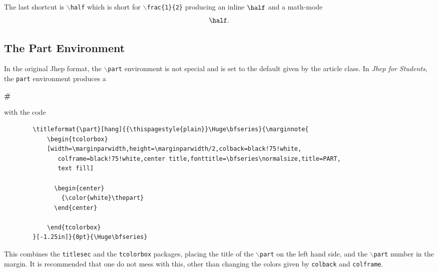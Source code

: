 \documentclass[10pt]{article}
\begin{document}
	The last shortcut is \texttt{$\backslash$half} which is short for \texttt{$\backslash$frac\{1\}\{2\}} producing an inline $\half$ and a math-mode
	\begin{equation*}
		\half.
	\end{equation*}



	\subsection{The Part Environment}
	In the original Jhep format, the \texttt{$\backslash$part} environment is not special and is set to the default given by the article class. In \textit{Jhep for Students}, the \texttt{part} environment produces a

	{{\centering
		\begin{tcolorbox}[width=\marginparwidth,height=\marginparwidth/2,colback=black!75!white,colframe=black!75!white,center title,fonttitle=\bfseries\normalsize,title=PART,text fill]
		  \begin{center}
		  {\color{white}\Huge\bfseries\#}
		  \end{center}
		\end{tcolorbox}
	}}
	\noindent with the code
	\begin{verbatim}
		\titleformat{\part}[hang]{{\thispagestyle{plain}}\Huge\bfseries}{\marginnote{
			\begin{tcolorbox}
			[width=\marginparwidth,height=\marginparwidth/2,colback=black!75!white,
			   colframe=black!75!white,center title,fonttitle=\bfseries\normalsize,title=PART,
			   text fill]

			  \begin{center}
			  	{\color{white}\thepart}
			  \end{center}

			\end{tcolorbox}
		}[-1.25in]}{0pt}{\Huge\bfseries}
	\end{verbatim}
	This combines the \texttt{titlesec} and the \texttt{tcolorbox} packages, placing the title of the \texttt{$\backslash$part} on the left hand side, and the \texttt{$\backslash$part} number in the margin. It is recommended that one do not mess with this, other than changing the colors given by \texttt{colback} and \texttt{colframe}.
	\newpage
\end{document}
